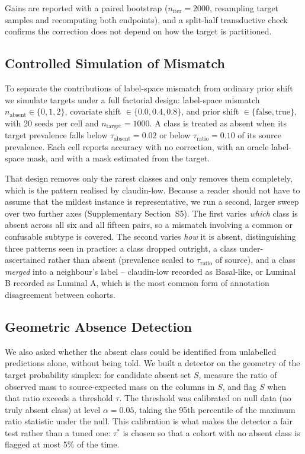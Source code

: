 \documentclass[10pt,journal,compsoc,twocolumn]{IEEEtran}
\begin{document}
Gains are reported with a paired bootstrap ($n_{\text{iter}} = 2000$, resampling target samples and recomputing both endpoints), and a split-half transductive check confirms the correction does not depend on how the target is partitioned.

\subsection{Controlled Simulation of Mismatch}
\label{sec:methods_sim}

To separate the contributions of label-space mismatch from ordinary prior shift we simulate targets under a full factorial design: label-space mismatch $n_{\text{absent}} \in \{0,1,2\}$, covariate shift $\in \{0.0, 0.4, 0.8\}$, and prior shift $\in \{\text{false}, \text{true}\}$, with 20 seeds per cell and $n_{\text{target}} = 1000$. A class is treated as absent when its target prevalence falls below $\tau_{\text{absent}} = 0.02$ or below $\tau_{\text{ratio}} = 0.10$ of its source prevalence. Each cell reports accuracy with no correction, with an oracle label-space mask, and with a mask estimated from the target.

That design removes only the rarest classes and only removes them completely, which is the pattern realised by claudin-low. Because a reader should not have to assume that the mildest instance is representative, we run a second, larger sweep over two further axes (Supplementary Section~S5). The first varies \emph{which} class is absent across all six and all fifteen pairs, so a mismatch involving a common or confusable subtype is covered. The second varies \emph{how} it is absent, distinguishing three patterns seen in practice: a class dropped outright, a class under-ascertained rather than absent (prevalence scaled to $\tau_{\text{ratio}}$ of source), and a class \emph{merged} into a neighbour's label -- claudin-low recorded as Basal-like, or Luminal B recorded as Luminal A, which is the most common form of annotation disagreement between cohorts.

\subsection{Geometric Absence Detection}
\label{sec:methods_detector}

We also asked whether the absent class could be identified from unlabelled predictions alone, without being told. We built a detector on the geometry of the target probability simplex: for candidate absent set $S$, measure the ratio of observed mass to source-expected mass on the columns in $S$, and flag $S$ when that ratio exceeds a threshold $\tau$. The threshold was calibrated on null data (no truly absent class) at level $\alpha = 0.05$, taking the 95th percentile of the maximum ratio statistic under the null. This calibration is what makes the detector a fair test rather than a tuned one: $\tau^*$ is chosen so that a cohort with no absent class is flagged at most 5\% of the time.
\end{document}
